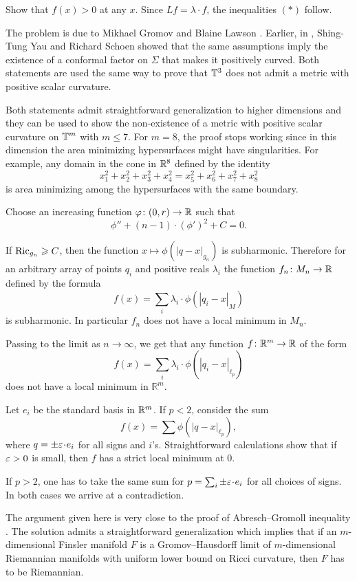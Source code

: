 Show that $f(x)>0$ at any $x$.
Since $Lf=\lambda\cdot f$, the inequalities $({*})$ follow.\qeds


The problem is due to Mikhael Gromov and Blaine Lawson \cite{gromov-lawson}.
Earlier, in \cite{schoen-yau}, Shing-Tung  Yau and Richard Schoen showed that the same assumptions 
imply the existence of a conformal factor on $\Sigma$ that makes it positively curved.
Both statements are used the same way
to prove that $\mathbb{T}^3$ does not admit a metric with positive scalar curvature.

Both statements admit straightforward generalization to higher dimensions
and they can be used to show the non-existence of a metric with positive scalar curvature on $\mathbb{T}^m$ with $m\le 7$.
For $m=8$, the proof stops working 
since in this dimension the area minimizing hypersurfaces might have singularities.
For example, 
any domain in the cone in $\mathbb{R}^8$
defined by the identity
\[x^2_1+x^2_2+x^2_3+x^2_4=x^2_5+x^2_6+x^2_7+x^2_8\]
is area minimizing among the hypersurfaces with the same boundary.





Choose an increasing function $\varphi\colon(0,r)\to \mathbb{R}$
such that 
\[\phi''+(n-1)\cdot(\phi')^2+C=0.\]

If $\operatorname{\rm Ric}_{g_n}\geqslant C$, 
then the function 
$x\mapsto\phi(|q-x|_{g_n})$ is subharmonic.
Therefore for an arbitrary array of points $q_i$ 
and positive reals $\lambda_i$ the function $f_n\colon M_n\to \mathbb{R}$
defined by the formula
$$f(x)=\sum_i\lambda_i\cdot\phi(|q_i-x|_M)$$
is subharmonic.
In particular $f_n$ does not have a local minimum in $M_n$.

Passing to the limit as $n\to \infty$, we get that any function $f\:\mathbb{R}^m\z\to\mathbb{R}$
of the form 
$$f(x)=\sum_i\lambda_i\cdot\phi(|q_i-x|_{\ell_p})$$
does not have a local minimum in $\mathbb{R}^m$.

Let $e_i$ be the standard basis in $\mathbb{R}^m$. 
If $p<2$, consider the sum 
$$f(x)=\sum\phi(|q-x|_{\ell_p}),$$
where $q=\pm\eps\cdot e_i$ for all signs and $i$'s.
Straightforward calculations show that if $\varepsilon>0$ is small, then $f$
has a strict local minimum at $0$.

If $p>2$, one has to take the same sum for  $p=\sum_i\pm\eps\cdot e_i$ for all choices of signs.
In both cases we arrive at a contradiction.
\qeds

The argument given here is very close to the proof of Abresch--Gromoll inequality \cite{abresch-gromoll}.
The solution admits a straightforward generalization which implies that if an $m$-dimensional  Finsler manifold $F$ is a Gromov--Hausdorff limit of $m$-dimensional Riemannian manifolds with uniform lower bound on Ricci curvature, then $F$ has to be Riemannian.

